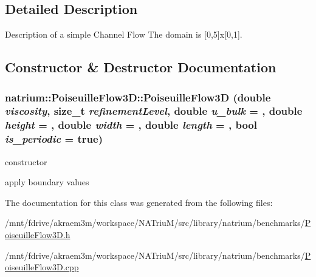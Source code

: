 \subsection{Detailed Description}
Description of a simple Channel Flow The domain is \mbox{[}0,5\mbox{]}x\mbox{[}0,1\mbox{]}. 

\subsection{Constructor \& Destructor Documentation}
\hypertarget{classnatrium_1_1PoiseuilleFlow3D_a65444fdaec3bb59ab98870acfcb297f1}{
\subsubsection[{PoiseuilleFlow3D}]{\setlength{\rightskip}{0pt plus 5cm}natrium::PoiseuilleFlow3D::PoiseuilleFlow3D (double {\em viscosity}, \/  size\_\-t {\em refinementLevel}, \/  double {\em u\_\-bulk} = {}, \/  double {\em height} = {}, \/  double {\em width} = {}, \/  double {\em length} = {}, \/  bool {\em is\_\-periodic} = {\ttfamily true})}}
\label{classnatrium_1_1PoiseuilleFlow3D_a65444fdaec3bb59ab98870acfcb297f1}


constructor 

apply boundary values 

The documentation for this class was generated from the following files:\begin{DoxyCompactItemize}
\item 
/mnt/fdrive/akraem3m/workspace/NATriuM/src/library/natrium/benchmarks/\hyperlink{PoiseuilleFlow3D_8h}{PoiseuilleFlow3D.h}\item 
/mnt/fdrive/akraem3m/workspace/NATriuM/src/library/natrium/benchmarks/\hyperlink{PoiseuilleFlow3D_8cpp}{PoiseuilleFlow3D.cpp}\end{DoxyCompactItemize}
